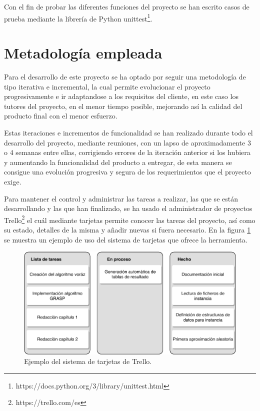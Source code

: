 Con el fin de probar las diferentes funciones del proyecto se han escrito casos de prueba mediante la librería de Python unittest\footnote{https://docs.python.org/3/library/unittest.html}.

\section{Metadología empleada}
Para el desarrollo de este proyecto se ha optado por seguir una metodología de tipo iterativa e incremental, la cual permite evolucionar el proyecto progresivamente e ir adaptandose a los requisitos del cliente, en este caso los tutores del proyecto, en el menor tiempo posible, mejorando así la calidad del producto final con el menor esfuerzo.

Estas iteraciones e incrementos de funcionalidad se han realizado durante todo el desarrollo del proyecto, mediante reuniones, con un lapso de aproximadamente 3 o 4 semanas entre ellas, corrigiendo errores de la iteración anterior si los hubiera y aumentando la funcionalidad del producto a entregar, de esta manera se consigue una evolución progresiva y segura de los requerimientos que el proyecto exige.

Para mantener el control y administrar las tareas a realizar, las que se están desarrollando y las que han finalizado, se ha usado el administrador de proyectos Trello\footnote{https://trello.com/es} el cuál mediante tarjetas permite conocer las tareas del proyecto, así como su estado, detalles de la misma y añadir nuevas si fuera necesario. En la figura \ref{fig:trello-tarjetas} se muestra un ejemplo de uso del sistema de tarjetas que ofrece la herramienta.

\begin{figure}[H]
	\centering
	\includegraphics{Figures/trello-tarjetas.pdf}
	\caption{Ejemplo del sistema de tarjetas de Trello.}
	\label{fig:trello-tarjetas}
\end{figure}

